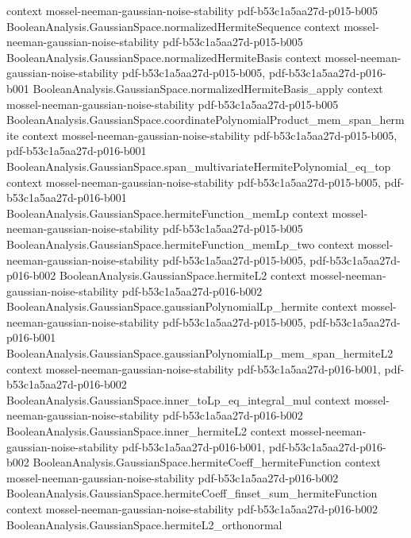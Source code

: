 \begin{theorem}
  {context}
  {mossel-neeman-gaussian-noise-stability}
  {pdf-b53c1a5aa27d-p015-b005}
\proofstep
  {BooleanAnalysis.GaussianSpace.normalizedHermiteSequence}
  {context}
  {mossel-neeman-gaussian-noise-stability}
  {pdf-b53c1a5aa27d-p015-b005}
\proofstep
  {BooleanAnalysis.GaussianSpace.normalizedHermiteBasis}
  {context}
  {mossel-neeman-gaussian-noise-stability}
  {pdf-b53c1a5aa27d-p015-b005,
    pdf-b53c1a5aa27d-p016-b001}
\proofstep
  {BooleanAnalysis.GaussianSpace.normalizedHermiteBasis_apply}
  {context}
  {mossel-neeman-gaussian-noise-stability}
  {pdf-b53c1a5aa27d-p015-b005}
\proofstep
  {BooleanAnalysis.GaussianSpace.coordinatePolynomialProduct_mem_span_hermite}
  {context}
  {mossel-neeman-gaussian-noise-stability}
  {pdf-b53c1a5aa27d-p015-b005,
    pdf-b53c1a5aa27d-p016-b001}
\proofstep
  {BooleanAnalysis.GaussianSpace.span_multivariateHermitePolynomial_eq_top}
  {context}
  {mossel-neeman-gaussian-noise-stability}
  {pdf-b53c1a5aa27d-p015-b005,
    pdf-b53c1a5aa27d-p016-b001}
\proofstep
  {BooleanAnalysis.GaussianSpace.hermiteFunction_memLp}
  {context}
  {mossel-neeman-gaussian-noise-stability}
  {pdf-b53c1a5aa27d-p015-b005}
\proofstep
  {BooleanAnalysis.GaussianSpace.hermiteFunction_memLp_two}
  {context}
  {mossel-neeman-gaussian-noise-stability}
  {pdf-b53c1a5aa27d-p015-b005,
    pdf-b53c1a5aa27d-p016-b002}
\proofstep
  {BooleanAnalysis.GaussianSpace.hermiteL2}
  {context}
  {mossel-neeman-gaussian-noise-stability}
  {pdf-b53c1a5aa27d-p016-b002}
\proofstep
  {BooleanAnalysis.GaussianSpace.gaussianPolynomialLp_hermite}
  {context}
  {mossel-neeman-gaussian-noise-stability}
  {pdf-b53c1a5aa27d-p015-b005,
    pdf-b53c1a5aa27d-p016-b001}
\proofstep
  {BooleanAnalysis.GaussianSpace.gaussianPolynomialLp_mem_span_hermiteL2}
  {context}
  {mossel-neeman-gaussian-noise-stability}
  {pdf-b53c1a5aa27d-p016-b001,
    pdf-b53c1a5aa27d-p016-b002}
\proofstep
  {BooleanAnalysis.GaussianSpace.inner_toLp_eq_integral_mul}
  {context}
  {mossel-neeman-gaussian-noise-stability}
  {pdf-b53c1a5aa27d-p016-b002}
\proofstep
  {BooleanAnalysis.GaussianSpace.inner_hermiteL2}
  {context}
  {mossel-neeman-gaussian-noise-stability}
  {pdf-b53c1a5aa27d-p016-b001,
    pdf-b53c1a5aa27d-p016-b002}
\proofstep
  {BooleanAnalysis.GaussianSpace.hermiteCoeff_hermiteFunction}
  {context}
  {mossel-neeman-gaussian-noise-stability}
  {pdf-b53c1a5aa27d-p016-b002}
\proofstep
  {BooleanAnalysis.GaussianSpace.hermiteCoeff_finset_sum_hermiteFunction}
  {context}
  {mossel-neeman-gaussian-noise-stability}
  {pdf-b53c1a5aa27d-p016-b002}
\proofstep
  {BooleanAnalysis.GaussianSpace.hermiteL2_orthonormal}

\end{theorem}
